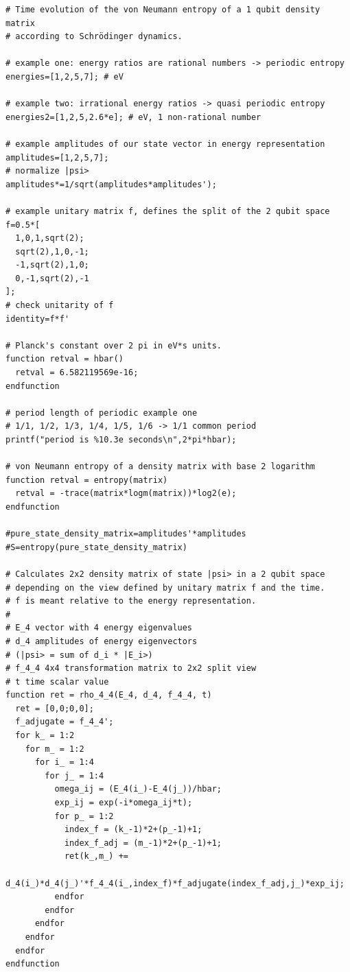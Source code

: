 \documentclass[12pt]{article}
\begin{document}
\begin{verbatim}
# Time evolution of the von Neumann entropy of a 1 qubit density matrix
# according to Schrödinger dynamics.

# example one: energy ratios are rational numbers -> periodic entropy
energies=[1,2,5,7]; # eV

# example two: irrational energy ratios -> quasi periodic entropy
energies2=[1,2,5,2.6*e]; # eV, 1 non-rational number

# example amplitudes of our state vector in energy representation
amplitudes=[1,2,5,7];
# normalize |psi>
amplitudes*=1/sqrt(amplitudes*amplitudes');

# example unitary matrix f, defines the split of the 2 qubit space
f=0.5*[
  1,0,1,sqrt(2);
  sqrt(2),1,0,-1;
  -1,sqrt(2),1,0;
  0,-1,sqrt(2),-1
];
# check unitarity of f
identity=f*f'

# Planck's constant over 2 pi in eV*s units.
function retval = hbar()
  retval = 6.582119569e-16; 
endfunction

# period length of periodic example one
# 1/1, 1/2, 1/3, 1/4, 1/5, 1/6 -> 1/1 common period
printf("period is %10.3e seconds\n",2*pi*hbar); 

# von Neumann entropy of a density matrix with base 2 logarithm
function retval = entropy(matrix)
  retval = -trace(matrix*logm(matrix))*log2(e);
endfunction

#pure_state_density_matrix=amplitudes'*amplitudes
#S=entropy(pure_state_density_matrix)

# Calculates 2x2 density matrix of state |psi> in a 2 qubit space
# depending on the view defined by unitary matrix f and the time.
# f is meant relative to the energy representation.
#
# E_4 vector with 4 energy eigenvalues
# d_4 amplitudes of energy eigenvectors
# (|psi> = sum of d_i * |E_i>)
# f_4_4 4x4 transformation matrix to 2x2 split view
# t time scalar value
function ret = rho_4_4(E_4, d_4, f_4_4, t)
  ret = [0,0;0,0];
  f_adjugate = f_4_4';
  for k_ = 1:2
    for m_ = 1:2
      for i_ = 1:4
        for j_ = 1:4
          omega_ij = (E_4(i_)-E_4(j_))/hbar;
          exp_ij = exp(-i*omega_ij*t);
          for p_ = 1:2
            index_f = (k_-1)*2+(p_-1)+1;
            index_f_adj = (m_-1)*2+(p_-1)+1;
            ret(k_,m_) +=
             d_4(i_)*d_4(j_)'*f_4_4(i_,index_f)*f_adjugate(index_f_adj,j_)*exp_ij;
          endfor
        endfor
      endfor
    endfor
  endfor
endfunction


\end{verbatim}
\end{document}
